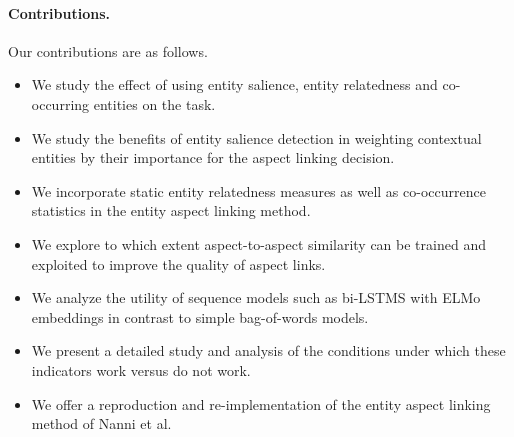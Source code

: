\paragraph{\textbf{Contributions.}} 


Our contributions are as follows.
\begin{itemize}

    \item We study the effect of using entity salience, entity relatedness and co-occurring entities on the task.
    \item We study the benefits of entity salience detection in weighting contextual entities by their importance for the aspect linking decision. 
    \item We incorporate static entity relatedness measures as well as co-occurrence statistics in the entity aspect linking method.
    \item We explore to which extent aspect-to-aspect similarity can be trained and exploited to improve the quality of aspect links. 
    \item We analyze the utility of sequence models such as bi-LSTMS with ELMo embeddings in contrast to simple bag-of-words models.
    \item We present a detailed study and analysis of the conditions under which these indicators work versus do not work. 
    \item We offer a reproduction and re-implementation of the entity aspect linking method of Nanni et al. \cite{nanni2018entity}
\end{itemize}

